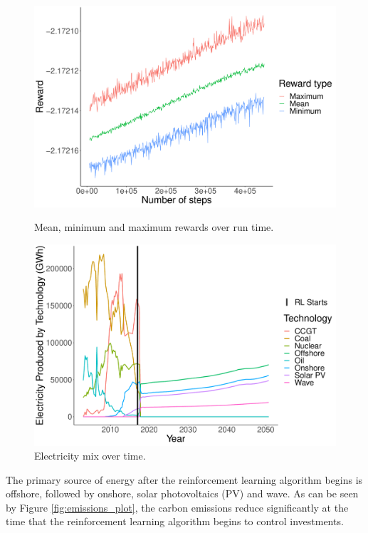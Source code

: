 \documentclass{article}
\begin{document}
\begin{figure}[h]
\centering
\begin{minipage}{.5\textwidth}
  \centering
  \includegraphics[width=\linewidth]{figures/runtime_steps_plot.pdf}
  \caption{Mean, minimum and maximum rewards over run time.}
  \label{fig:days_reward_plot}
\end{minipage}%
\begin{minipage}{.5\textwidth}
  \centering
  \includegraphics[width=\linewidth]{figures/electricity_generated_plot.pdf}
  \caption{Electricity mix over time.}
  \label{fig:electricity_generated_plot}
\end{minipage}
\end{figure}

The primary source of energy after the reinforcement learning algorithm begins is offshore, followed by onshore, solar photovoltaics (PV) and wave. As can be seen by Figure \ref{fig:emissions_plot}, the carbon emissions reduce significantly at the time that the reinforcement learning algorithm begins to control investments. 
\end{document}
